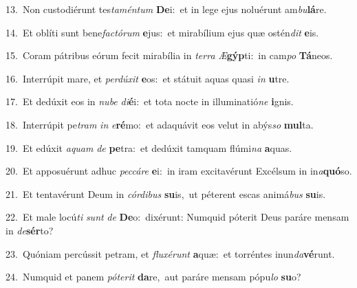 {\numbfont\textcolor{\numbcolor}{13.}}~Non custodiérunt tes\-\textit{ta}\-\textit{mén}\textit{tum} \textbf{De}\-i:~\star et in lege ejus noluérunt am\-\textit{bu}\-\textbf{lá}re.\par
{\numbfont\textcolor{\numbcolor}{14.}}~Et oblíti sunt bene\-\textit{fac}\-\textit{tó}\textit{rum} \textbf{e}\-jus:~\star et mirabílium ejus quæ ostén\textit{dit} \textbf{e}\-is.\par
{\numbfont\textcolor{\numbcolor}{15.}}~Coram pátribus eórum fecit mirabília in \textit{ter}\-\textit{ra} \textit{Æ}\-\textbf{gýp}ti:~\star in cam\textit{po} \textbf{Tá}\-neos.\par
{\numbfont\textcolor{\numbcolor}{16.}}~Interrúpit mare, et \textit{per}\-\textit{dú}\textit{xit} \textbf{e}\-os:~\star et státuit aquas quasi \textit{in} \textbf{u}\-tre.\par
{\numbfont\textcolor{\numbcolor}{17.}}~Et dedúxit eos in \textit{nu}\-\textit{be} \textit{di}\-\textbf{é}i:~\star et tota nocte in illuminatió\textit{ne} \textbf{i}\-gnis.\par
{\numbfont\textcolor{\numbcolor}{18.}}~Interrúpit pe\textit{tram} \textit{in} \textit{e}\-\textbf{ré}mo:~\star et adaquávit eos velut in abýs\textit{so} \textbf{mul}\-ta.\par
{\numbfont\textcolor{\numbcolor}{19.}}~Et edúxit \textit{a}\-\textit{quam} \textit{de} \textbf{pe}\-tra:~\star et dedúxit tamquam flúmi\textit{na} \textbf{a}\-quas.\par
{\numbfont\textcolor{\numbcolor}{20.}}~Et apposuérunt adhuc \textit{pec}\-\textit{cá}\textit{re} \textbf{e}\-i:~\star in iram excitavérunt Excélsum in in\-\textit{a}\-\textbf{quó}so.\par
{\numbfont\textcolor{\numbcolor}{21.}}~Et tentavérunt Deum in \textit{cór}\-\textit{di}\textit{bus} \textbf{su}\-is,~\star ut péterent escas animá\textit{bus} \textbf{su}\-is.\par
{\numbfont\textcolor{\numbcolor}{22.}}~Et male locú\textit{ti} \textit{sunt} \textit{de} \textbf{De}\-o:~\star dixérunt: Numquid póterit Deus paráre mensam in \textit{de}\-\textbf{sér}to?\par
{\numbfont\textcolor{\numbcolor}{23.}}~Quóniam percússit petram, et \textit{flu}\-\textit{xé}\textit{runt} \textbf{a}\-quæ:~\star et torréntes inun\-\textit{da}\-\textbf{vé}runt.\par
{\numbfont\textcolor{\numbcolor}{24.}}~Numquid et panem \textit{pót}\-\textit{e}\textit{rit} \textbf{da}\-re,~\star aut paráre mensam pópu\textit{lo} \textbf{su}\-o?\par
